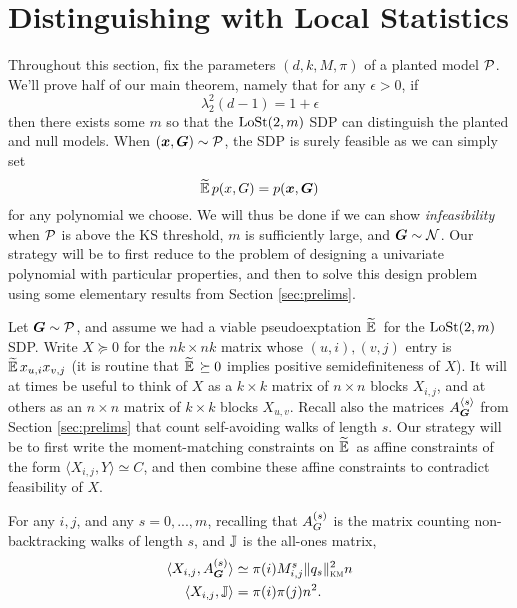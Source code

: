 \section{Distinguishing with Local Statistics}    
\label{sec:algo}

Throughout this section, fix the parameters $(d,k,M,\pi)$ of a planted model $\mathcal{P}$. We'll prove half of our main theorem, namely that for any $\epsilon > 0$, if
$$
    \lambda_2^2(d-1) = 1 + \epsilon
$$
then there exists some $m$ so that the $\operatorname{LoSt}(2,m)$ SDP can distinguish the planted and null models. When $({\boldsymbol{x}},\boldsymbol{G}) \sim \mathcal{P}$, the SDP is surely feasible as we can simply set
$$
    \widetilde{\operatorname*{\mathbb{E}}}\, p(x,G) = p({\boldsymbol{x}},\boldsymbol{G})
$$
for any polynomial we choose. We will thus be done if we can show \textit{infeasibility} when $\mathcal{P}$ is above the KS threshold, $m$ is sufficiently large, and $\boldsymbol{G}\sim \mathcal{N}$. Our strategy will be to first reduce to the problem of designing a univariate polynomial with particular properties, and then to solve this design problem using some elementary results from Section \ref{sec:prelims}.

Let $\boldsymbol{G} \sim \mathcal{P}$, and assume we had a viable pseudoexptation $\widetilde{\operatorname*{\mathbb{E}}}\,$ for the $\operatorname{LoSt}(2,m)$ SDP. Write $X \succeq 0$ for the $nk\times nk$ matrix whose $(u,i),(v,j)$ entry is $\widetilde{\operatorname*{\mathbb{E}}}\, x_{u,i}x_{v,j}$ (it is routine that $\widetilde{\operatorname*{\mathbb{E}}}\, \succeq 0$ implies positive semidefiniteness of $X$). It will at times be useful to think of $X$ as a $k\times k$ matrix of $n\times n$ blocks $X_{i,j}$, and at others as an $n\times n$ matrix of $k\times k$ blocks $X_{u,v}$. Recall also the matrices $A^{\langle s \rangle}_{\boldsymbol{G}}$ from Section \ref{sec:prelims} that count self-avoiding walks of length $s$. Our strategy will be to first write the moment-matching constraints on $\widetilde{\operatorname*{\mathbb{E}}}\,$ as affine constraints of the form $\langle X_{i,j}, Y \rangle \simeq C$, and then combine these affine constraints to contradict feasibility of $X$.

\begin{lemma}
    For any $i,j$, and any $s = 0,...,m$, recalling that $A^{(s)}_{G}$ is the matrix counting non-backtracking walks of length $s$, and $\mathbb{J}$ is the all-ones matrix,
    \begin{align*}
        \langle X_{i,j}, A^{(s)}_{\boldsymbol{G}} \rangle &\simeq \pi(i) M_{i,j}^s \|q_s\|^2_{\textsc{km}} n \\
        \langle X_{i,j}, \mathbb{J} \rangle &= \pi(i)\pi(j)n^2.
    \end{align*}
\end{lemma}

